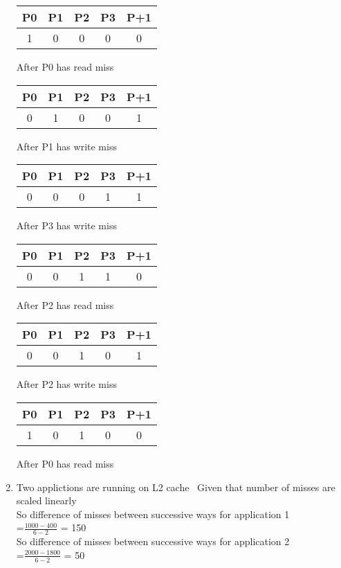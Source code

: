 \documentclass[12pt]{article}
\begin{document}
\begin{enumerate}
	
	\begin{tabular}{ |c|c|c|c|c| } 
		
		P0 & P1 & P2 & P3 & P+1 \\ 
		\hline
		1 & 0 & 0 & 0 & 0 \\ 
		\hline
	\end{tabular}
	After P0 has read miss\\
	
	
	\begin{tabular}{ |c|c|c|c|c| } 
		
		P0 & P1 & P2 & P3 & P+1 \\ 
		\hline
		0 & 1 & 0 & 0 & 1 \\ 
		\hline
	\end{tabular}
	After P1 has write miss\\
	
	
	\begin{tabular}{ |c|c|c|c|c| } 
		
		P0 & P1 & P2 & P3 & P+1 \\ 
		\hline
		0 & 0 & 0 & 1 & 1 \\ 
		\hline
	\end{tabular}
	After P3 has write miss\\
	
	
	\begin{tabular}{ |c|c|c|c|c| } 
		
		P0 & P1 & P2 & P3 & P+1 \\ 
		\hline
		0 & 0 & 1 & 1 & 0 \\ 
		\hline
	\end{tabular}
	After P2 has read miss\\
	
	
	\begin{tabular}{ |c|c|c|c|c| } 
		
		P0 & P1 & P2 & P3 & P+1 \\ 
		\hline
		0 & 0 & 1 & 0 & 1 \\ 
		\hline
	\end{tabular}
	After P2 has write miss\\
	
	\begin{tabular}{ |c|c|c|c|c| } 
		
		P0 & P1 & P2 & P3 & P+1 \\ 
		\hline
		1 & 0 & 1 & 0 & 0 \\ 
		\hline
	\end{tabular}
	After P0 has read miss\\
	
	\item Two applictions are running on L2 cache \
	Given that number of misses are scaled linearly \\
	So difference of misses between successive ways for application 1\\
	=\(\frac{1000-400}{6-2}\) = 150\\
	So difference of misses between successive ways for application 2 \\
	=\(\frac{2000-1800}{6-2}\) = 50\\
	

\end{enumerate}
\end{document}
